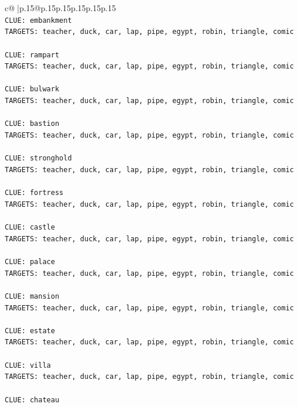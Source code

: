 \documentclass{article}
\begin{document}
{\begin{supertabular}{c@{$\;$}|p{.15\linewidth}@{}p{.15\linewidth}p{.15\linewidth}p{.15\linewidth}p{.15\linewidth}p{.15\linewidth}}
{{{\\ 
\texttt{CLUE: embankment} \\
\texttt{TARGETS: teacher, duck, car, lap, pipe, egypt, robin, triangle, comic} \\
\\ 
\texttt{CLUE: rampart} \\
\texttt{TARGETS: teacher, duck, car, lap, pipe, egypt, robin, triangle, comic} \\
\\ 
\texttt{CLUE: bulwark} \\
\texttt{TARGETS: teacher, duck, car, lap, pipe, egypt, robin, triangle, comic} \\
\\ 
\texttt{CLUE: bastion} \\
\texttt{TARGETS: teacher, duck, car, lap, pipe, egypt, robin, triangle, comic} \\
\\ 
\texttt{CLUE: stronghold} \\
\texttt{TARGETS: teacher, duck, car, lap, pipe, egypt, robin, triangle, comic} \\
\\ 
\texttt{CLUE: fortress} \\
\texttt{TARGETS: teacher, duck, car, lap, pipe, egypt, robin, triangle, comic} \\
\\ 
\texttt{CLUE: castle} \\
\texttt{TARGETS: teacher, duck, car, lap, pipe, egypt, robin, triangle, comic} \\
\\ 
\texttt{CLUE: palace} \\
\texttt{TARGETS: teacher, duck, car, lap, pipe, egypt, robin, triangle, comic} \\
\\ 
\texttt{CLUE: mansion} \\
\texttt{TARGETS: teacher, duck, car, lap, pipe, egypt, robin, triangle, comic} \\
\\ 
\texttt{CLUE: estate} \\
\texttt{TARGETS: teacher, duck, car, lap, pipe, egypt, robin, triangle, comic} \\
\\ 
\texttt{CLUE: villa} \\
\texttt{TARGETS: teacher, duck, car, lap, pipe, egypt, robin, triangle, comic} \\
\\ 
\texttt{CLUE: chateau} \\
}}}
\end{supertabular}}
\end{document}
